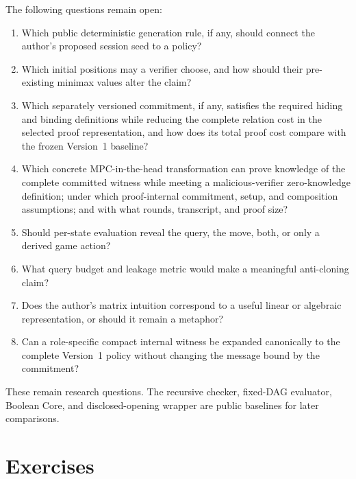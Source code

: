 The following questions remain open:

\begin{enumerate}
    \item Which public deterministic generation rule, if any, should connect
    the author's proposed session seed to a policy?
    \item Which initial positions may a verifier choose, and how should their
    pre-existing minimax values alter the claim?
    \item Which separately versioned commitment, if any, satisfies the
    required hiding and binding definitions while reducing the complete
    relation cost in the selected proof representation, and how does its total
    proof cost compare with the frozen Version~1 baseline?
    \item Which concrete MPC-in-the-head transformation can prove knowledge of
    the complete committed witness while meeting a malicious-verifier
    zero-knowledge definition; under which proof-internal commitment, setup,
    and composition assumptions; and with what rounds, transcript, and proof
    size?
    \item Should per-state evaluation reveal the query, the move, both, or only
    a derived game action?
    \item What query budget and leakage metric would make a meaningful
    anti-cloning claim?
    \item Does the author's matrix intuition correspond to a useful linear or
    algebraic representation, or should it remain a metaphor?
    \item Can a role-specific compact internal witness be expanded
    canonically to the complete Version~1 policy without changing the message
    bound by the commitment?
\end{enumerate}

These remain research questions. The recursive checker, fixed-DAG evaluator,
Boolean Core, and disclosed-opening wrapper are public baselines for later
comparisons.

\section{Exercises}
\label{sec:ttt-exercises}

